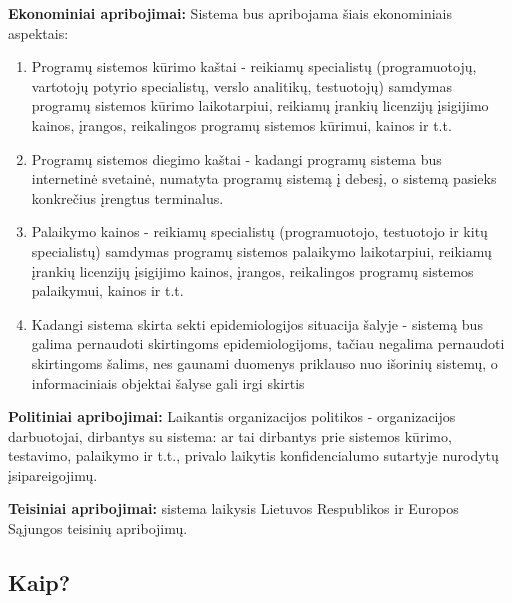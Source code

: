 \documentclass{VUMIFPSkursinis}
\begin{document}
\textbf{Ekonominiai apribojimai:}
Sistema bus apribojama šiais ekonominiais aspektais:
	\begin{enumerate}
		\item Programų sistemos kūrimo kaštai - reikiamų specialistų (programuotojų, vartotojų potyrio specialistų, verslo analitikų, testuotojų) samdymas programų sistemos kūrimo laikotarpiui, reikiamų įrankių licenzijų įsigijimo kainos, įrangos, reikalingos programų sistemos kūrimui, kainos ir t.t. 
		\item Programų sistemos diegimo kaštai - kadangi programų sistema bus internetinė svetainė, numatyta programų sistemą į debesį, o sistemą pasieks konkrečius įrengtus terminalus.
		\item Palaikymo kainos - reikiamų specialistų (programuotojo, testuotojo ir kitų specialistų) samdymas programų sistemos palaikymo laikotarpiui, reikiamų įrankių licenzijų įsigijimo kainos, įrangos, reikalingos programų sistemos palaikymui, kainos ir t.t.
		\item Kadangi sistema skirta sekti epidemiologijos situacija šalyje - sistemą bus galima pernaudoti skirtingoms epidemiologijoms, tačiau negalima pernaudoti skirtingoms šalims, nes gaunami duomenys priklauso nuo išorinių sistemų, o informaciniais objektai šalyse gali irgi skirtis 
	\end{enumerate}

\textbf{Politiniai apribojimai:} Laikantis organizacijos politikos - organizacijos darbuotojai, dirbantys su sistema: ar tai dirbantys prie sistemos kūrimo, testavimo, palaikymo ir t.t., privalo laikytis konfidencialumo sutartyje nurodytų įsipareigojimų.

\textbf{Teisiniai apribojimai:} sistema laikysis Lietuvos Respublikos ir Europos Sąjungos teisinių apribojimų.
\subsection{Kaip?}
\end{document}
